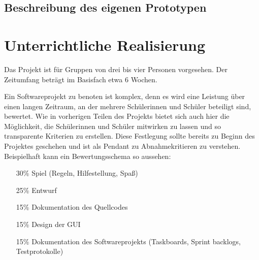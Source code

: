 \documentclass[a4paper,12pt]{article}
\newcommand{\sus}{Schülerinnen und Schüler}
\begin{document}
\subsection{Beschreibung des eigenen Prototypen}


\section{Unterrichtliche Realisierung}

    Das Projekt ist für Gruppen von drei bis vier Personen vorgesehen.
    Der Zeitumfang beträgt im Basisfach etwa 6 Wochen.

    Ein Softwareprojekt zu benoten ist komplex, denn es wird eine Leistung über
    einen langen Zeitraum, an der mehrere \sus{} beteiligt sind, bewertet.
    Wie in vorherigen Teilen des Projekts bietet sich auch hier die Möglichkeit,
    die \sus{} mitwirken zu lassen und so transparente Kriterien zu erstellen.
    Diese Festlegung sollte bereits zu Beginn des Projektes geschehen und ist 
    als Pendant zu Abnahmekritieren zu verstehen.
    Beispielhaft kann ein Bewertungsschema so aussehen:

    \begin{itemize}
        \item[30\%] Spiel (Regeln, Hilfestellung, Spaß)
        \item[25\%] Entwurf
        \item[15\%] Dokumentation des Quellcodes
        \item[15\%] Design der GUI
        \item[15\%] Dokumentation des Softwareprojekts (Taskboards, Sprint backlogs, Testprotokolle)
    \end{itemize}
\end{document}
